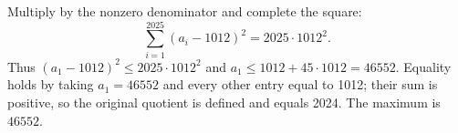 Multiply by the nonzero denominator and complete the square:
\[\sum_{i=1}^{2025}(a_i-1012)^2=2025\cdot1012^2.\]
Thus $(a_1-1012)^2\le2025\cdot1012^2$ and $a_1\le1012+45\cdot1012=46552$. Equality holds by taking $a_1=46552$ and every other entry equal to 1012; their sum is positive, so the original quotient is defined and equals 2024. The maximum is $\boxed{46552}$.
